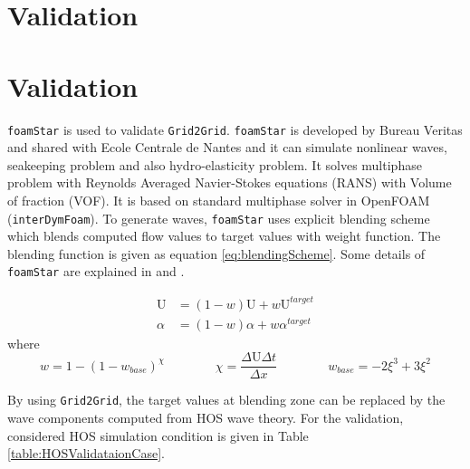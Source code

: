\pagebreak
	\section{Validation}
	
\section{Validation}
	
	\texttt{foamStar} is used to validate \texttt{Grid2Grid}. \texttt{foamStar} is developed by Bureau Veritas and shared with Ecole Centrale de Nantes and it can simulate nonlinear waves, seakeeping problem and also hydro-elasticity problem. It solves multiphase problem with Reynolds Averaged Navier-Stokes equations (RANS) with Volume of fraction (VOF). It is based on standard multiphase solver in OpenFOAM (\texttt{interDymFoam}). To generate waves, \texttt{foamStar} uses explicit blending scheme which blends computed flow values to target values with weight function. The blending function is given as equation \eqref{eq:blendingScheme}. Some details of \texttt{foamStar} are explained in \cite{sopheakThesis} and \cite{Charles2017}.
	
	{
		\begin{subequations}
			\label{eq:blendingScheme}
			\begin{align}		
				\text{U} 	 &= (1-w)\text{U}  + w\text{U}^{target} \\
				\alpha 		&= (1-w)\alpha + w\alpha^{target}
			\end{align}
		\end{subequations}
		\centering
		where            
		\begin{equation*}
		w = 1 - (1-w_{base})^{\chi} \qquad  \qquad \chi = \dfrac{\Delta \text{U} \Delta t}{\Delta x} \qquad \qquad  w_{base} = -2\xi^3 + 3\xi^2
		\end{equation*} 
	}

	By using \texttt{Grid2Grid}, the target values at blending zone can be replaced by the wave components computed from HOS wave theory. For the validation, considered HOS simulation condition is given in Table \ref{table:HOSValidataionCase}.
	
